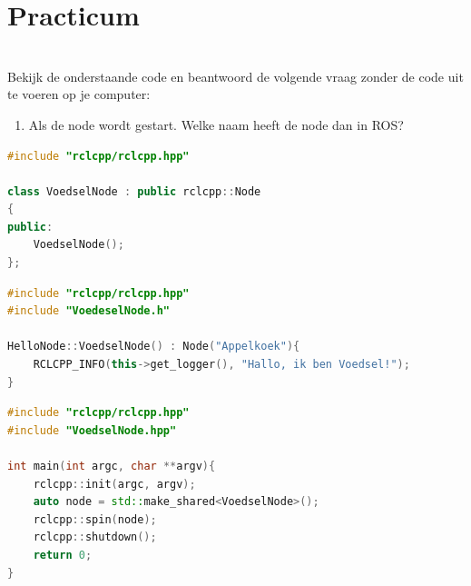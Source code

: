 \chapter{Practicum}

\begin{exercise}\mbox{}\\
Bekijk de onderstaande code en beantwoord de volgende vraag zonder de code uit te voeren op je computer:
\begin{enumerate}
    \item Als de node wordt gestart. Welke naam heeft de node dan in ROS?
\end{enumerate}


\begin{minipage}{0.9\linewidth}
\begin{lstlisting}[language=C++, firstnumber=0]
#include "rclcpp/rclcpp.hpp"

class VoedselNode : public rclcpp::Node
{
public:
    VoedselNode();
};

\end{lstlisting}
\end{minipage}

\begin{minipage}{0.9\linewidth}
\begin{lstlisting}[language=C++, firstnumber=0]
#include "rclcpp/rclcpp.hpp"
#include "VoedeselNode.h"

HelloNode::VoedselNode() : Node("Appelkoek"){
    RCLCPP_INFO(this->get_logger(), "Hallo, ik ben Voedsel!");
}
\end{lstlisting}
\end{minipage}

\begin{minipage}{0.9\linewidth}
\begin{lstlisting}[language=C++, firstnumber=0]
#include "rclcpp/rclcpp.hpp"
#include "VoedselNode.hpp"

int main(int argc, char **argv){
    rclcpp::init(argc, argv);
    auto node = std::make_shared<VoedselNode>();
    rclcpp::spin(node); 
    rclcpp::shutdown(); 
    return 0;
}
\end{lstlisting}
\end{minipage}
\end{exercise}

